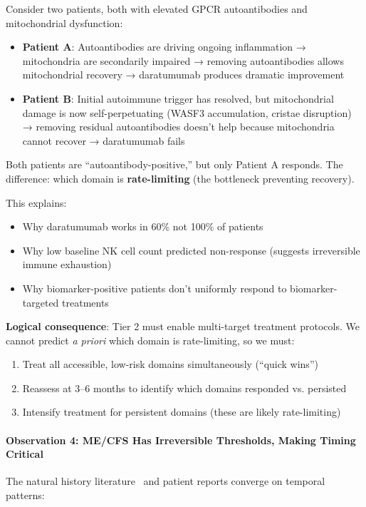 Consider two patients, both with elevated GPCR autoantibodies and mitochondrial dysfunction:
\begin{itemize}
    \item \textbf{Patient A}: Autoantibodies are driving ongoing inflammation → mitochondria are secondarily impaired → removing autoantibodies allows mitochondrial recovery → daratumumab produces dramatic improvement
    \item \textbf{Patient B}: Initial autoimmune trigger has resolved, but mitochondrial damage is now self-perpetuating (WASF3 accumulation, cristae disruption) → removing residual autoantibodies doesn't help because mitochondria cannot recover → daratumumab fails
\end{itemize}

Both patients are ``autoantibody-positive,'' but only Patient A responds. The difference: which domain is \textbf{rate-limiting} (the bottleneck preventing recovery).

This explains:
\begin{itemize}
    \item Why daratumumab works in 60\% not 100\% of patients~\cite{Fluge2025daratumumab}
    \item Why low baseline NK cell count predicted non-response (suggests irreversible immune exhaustion)
    \item Why biomarker-positive patients don't uniformly respond to biomarker-targeted treatments
\end{itemize}

\textbf{Logical consequence}: Tier 2 must enable multi-target treatment protocols. We cannot predict \textit{a priori} which domain is rate-limiting, so we must:
\begin{enumerate}
    \item Treat all accessible, low-risk domains simultaneously (``quick wins'')
    \item Reassess at 3--6 months to identify which domains responded vs. persisted
    \item Intensify treatment for persistent domains (these are likely rate-limiting)
\end{enumerate}

\paragraph{Observation 4: ME/CFS Has Irreversible Thresholds, Making Timing Critical}

The natural history literature~\cite{Maksoud2020natural} and patient reports converge on temporal patterns:

